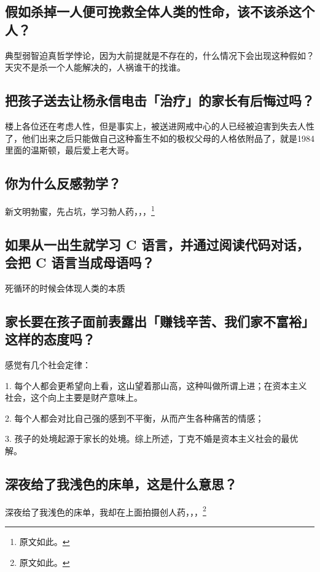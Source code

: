 \documentclass{ctexart}
\begin{document}
	\subsection{假如杀掉一人便可挽救全体人类的性命，该不该杀这个人？}
	
	典型弱智迫真哲学悖论，因为大前提就是不存在的，什么情况下会出现这种假如？天灾不是杀一个人能解决的，人祸谁干的找谁。
	
	\subsection{把孩子送去让杨永信电击「治疗」的家长有后悔过吗？}
	
	楼上各位还在考虑人性，但是事实上，被送进网戒中心的人已经被迫害到失去人性了，他们出来之后只能做自己这种畜生不如的极权父母的人格依附品了，就是1984里面的温斯顿，最后爱上老大哥。
	
	\subsection{你为什么反感勃学？}
	
	新文明勃蜜，先占坑，学习勃人药，，，\footnote{原文如此。}
	
	\subsection{如果从一出生就学习 C 语言，并通过阅读代码对话，会把 C 语言当成母语吗？}
	
	死循环的时候会体现人类的本质
	
	\subsection{家长要在孩子面前表露出「赚钱辛苦、我们家不富裕」这样的态度吗？}
	
	感觉有几个社会定律：
	
	1. 每个人都会更希望向上看，这山望着那山高，这种叫做所谓上进；在资本主义社会，这个向上主要是财产意味上。
	
	2. 每个人都会对比自己强的感到不平衡，从而产生各种痛苦的情感；
	
	3. 孩子的处境起源于家长的处境。综上所述，丁克不婚是资本主义社会的最优解。
	
	\subsection{深夜给了我浅色的床单，这是什么意思？}
	
	深夜给了我浅色的床单，我却在上面拍摄创人药，，，\footnote{原文如此。}
	
\end{document}
